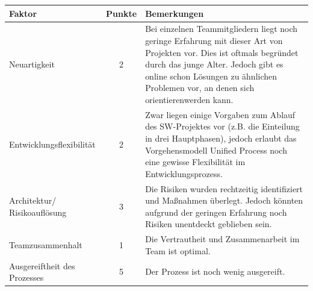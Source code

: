 \documentclass[../review_3.tex]{subfiles}
\begin{document}
\begin{longtable}[h] {l c p{8.0cm}}
    \toprule
    \textbf{Faktor}              & \textbf{Punkte} & \textbf{Bemerkungen}                                                                                                                                                                                                                                  \\ \midrule \endhead
    Neuartigkeit                 & 2               & Bei einzelnen Teammitgliedern liegt noch geringe Erfahrung mit dieser Art von Projekten vor. Dies ist oftmals begründet durch das junge Alter. Jedoch gibt es online schon Lösungen zu ähnlichen Problemen vor, an denen sich orientierenwerden kann. \\
    Entwicklungsflexibilität     & 2               & Zwar liegen einige Vorgaben zum Ablauf des SW-Projektes vor (z.B. die Einteilung in drei Hauptphasen), jedoch erlaubt das Vorgehensmodell Unified Process noch eine gewisse Flexibilität im Entwicklungsprozess.                                      \\
    Architektur/ Risikoauflösung & 3               & Die Risiken wurden rechtzeitig identifiziert und Maßnahmen überlegt. Jedoch könnten aufgrund der geringen Erfahrung noch Risiken unentdeckt geblieben sein.                                                                                           \\
    Teamzusammenhalt             & 1               & Die Vertrautheit und Zusammenarbeit im Team ist optimal.                                                                                                                                                                                              \\
    Ausgereiftheit des Prozesses & 5               & Der Prozess ist noch wenig ausgereift.                                                                                                                                                                                                                \\ \bottomrule
\end{longtable}
\end{document}
